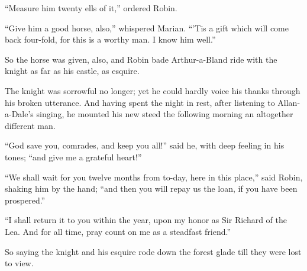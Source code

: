 ``Measure him twenty ells of it,'' ordered Robin.

``Give him a good horse, also,'' whispered Marian. ``'Tis a gift which
will come back four-fold, for this is a worthy man. I know him well.''

So the horse was given, also, and Robin bade Arthur-a-Bland ride with
the knight as far as his castle, as esquire.

The knight was sorrowful no longer; yet he could hardly voice his thanks
through his broken utterance. And having spent the night in rest, after
listening to Allan-a-Dale's singing, he mounted his new steed the
following morning an altogether different man.

``God save you, comrades, and keep you all!'' said he, with deep feeling
in his tones; ``and give me a grateful heart!''

``We shall wait for you twelve months from to-day, here in this place,''
said Robin, shaking him by the hand; ``and then you will repay us the
loan, if you have been prospered.''

``I shall return it to you within the year, upon my honor as Sir Richard
of the Lea. And for all time, pray count on me as a steadfast friend.''

So saying the knight and his esquire rode down the forest glade till
they were lost to view.
